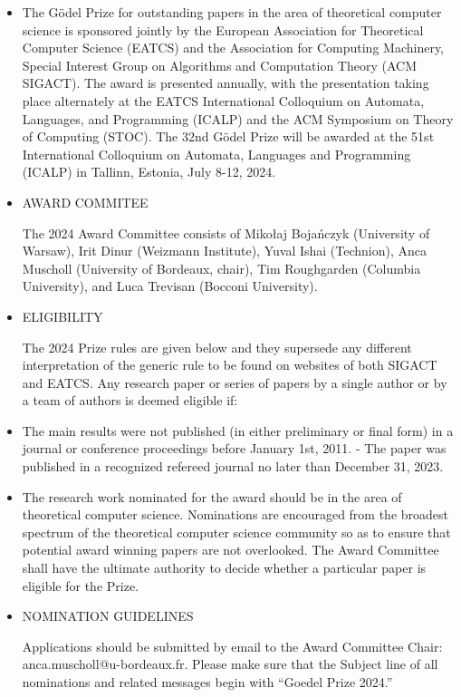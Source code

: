 \documentclass[prodmode,acmtecs]{acmsmall} %
\begin{document}
\begin{itemize}\item  The Gödel Prize for outstanding papers in the area of theoretical computer science is sponsored jointly by the European Association for Theoretical Computer Science (EATCS) and the Association for Computing Machinery, Special Interest Group on Algorithms and Computation Theory (ACM SIGACT). The award is presented annually, with the presentation taking place alternately at the EATCS International Colloquium on Automata, Languages, and Programming (ICALP) and the ACM Symposium on Theory of Computing (STOC). The 32nd Gödel Prize will be awarded at the 51st International Colloquium on Automata, Languages and Programming (ICALP) in Tallinn, Estonia, July 8-12, 2024. 
 
\item  AWARD COMMITEE 
 
  The 2024 Award Committee consists of Mikołaj Bojańczyk (University of Warsaw), Irit Dinur (Weizmann Institute), Yuval Ishai (Technion), Anca Muscholl (University of Bordeaux, chair), Tim Roughgarden (Columbia University), and Luca Trevisan (Bocconi University). 
 
\item  ELIGIBILITY 
 
  The 2024 Prize rules are given below and they supersede any different interpretation of the generic rule to be found on websites of both SIGACT and EATCS. Any research paper or series of papers by a single author or by a team of authors is deemed eligible if: 
 
\item  The main results were not published (in either preliminary or final form) in a journal or conference proceedings before January 1st, 2011. - The paper was published in a recognized refereed journal no later than December 31, 2023. 
 
\item  The research work nominated for the award should be in the area of theoretical computer science. Nominations are encouraged from the broadest spectrum of the theoretical computer science community so as to ensure that potential award winning papers are not overlooked. The Award Committee shall have the ultimate authority to decide whether a particular paper is eligible for the Prize. 
 
\item  NOMINATION GUIDELINES 
 
  Applications should be submitted by email to the Award Committee Chair: anca.muscholl@u-bordeaux.fr. Please make sure that the Subject line of all nominations and related messages begin with “Goedel Prize 2024.” 
 

\end{itemize}
\end{document}

